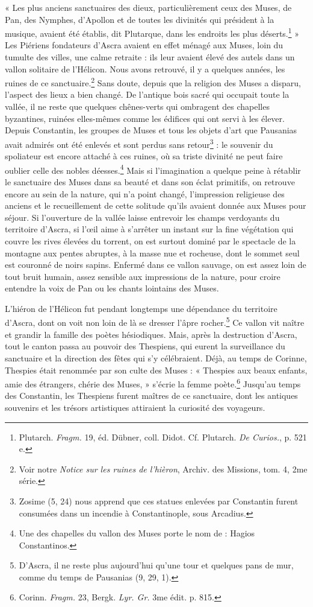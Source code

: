 \documentclass[landscape, a4paper, 11pt, oneside, polutonikogreek, french]{article}
\begin{document}
« Les plus anciens sanctuaires des dieux, particulièrement ceux des Muses, de Pan, des Nymphes, d'Apollon et de toutes les divinités qui président à la musique, avaient été établis, dit Plutarque, dans les endroits les plus déserts.\footnote{Plutarch. \emph{Fragm.} 19, éd. Dübner, coll. Didot. Cf. Plutarch. \emph{De Curios.}, p. 521 e.} » Les Piériens fondateurs d'Ascra avaient en effet ménagé aux Muses, loin du tumulte des villes, une calme retraite : ils leur avaient élevé des autels dans un vallon solitaire de l'Hélicon. Nous avons retrouvé, il y a quelques années, les ruines de ce sanctuaire.\footnote{Voir notre \emph{Notice sur les ruines de l'hièron}, Archiv. des Missions, tom. 4, 2me série.} Sans doute, depuis que la religion des Muses a disparu, l'aspect des lieux a bien changé. De l'antique bois sacré qui occupait toute la vallée, il ne reste que quelques chênes-verts qui ombragent des chapelles byzantines, ruinées elles-mêmes comme les édifices qui ont servi à les élever. Depuis Constantin, les groupes de Muses et tous les objets d'art que Pausanias avait admirés ont été enlevés et sont perdus sans retour\footnote{Zosime (5, 24) nous apprend que ces statues enlevées par Constantin furent consumées dans un incendie à Constantinople, sous Arcadius.} : le souvenir du spoliateur est encore attaché à ces ruines, où sa triste divinité ne peut faire oublier celle des nobles déesses.\footnote{Une des chapelles du vallon des Muses porte le nom de : Hagios Constantinos.} Mais si l'imagination a quelque peine à rétablir le sanctuaire des Muses dans sa beauté et dans son éclat primitifs, on retrouve encore au sein de la nature, qui n'a point changé, l'impression religieuse des anciens et le recueillement de cette solitude qu'ils avaient donnée aux Muses pour séjour. Si l'ouverture de la vallée laisse entrevoir les champs verdoyants du territoire d'Ascra, si l'œil aime à s'arrêter un instant sur la fine végétation qui couvre les rives élevées du torrent, on est surtout dominé par le spectacle de la montagne aux pentes abruptes, à la masse nue et rocheuse, dont le sommet seul est couronné de noirs sapins. Enfermé dans ce vallon sauvage, on est assez loin de tout bruit humain, assez sensible aux impressions de la nature, pour croire entendre la voix de Pan ou les chants lointains des Muses.

L'hiéron de l'Hélicon fut pendant longtemps une dépendance du territoire d'Ascra, dont on voit non loin de là se dresser l'âpre rocher.\footnote{D'Ascra, il ne reste plus aujourd'hui qu'une tour et quelques pans de mur, comme du temps de Pausanias (9, 29, 1).} Ce vallon vit naître et grandir la famille des poètes hésiodiques. Mais, après la destruction d'Ascra, tout le canton passa au pouvoir des Thespiens, qui eurent la surveillance du sanctuaire et la direction des fêtes qui s'y célébraient. Déjà, au temps de Corinne, Thespies était renommée par son culte des Muses : « Thespies aux beaux enfants, amie des étrangers, chérie des Muses, » s'écrie la femme poète.\footnote{Corinn. \emph{Fragm.} 23, Bergk. \emph{Lyr. Gr.} 3me édit. p. 815.} Jusqu'au temps des Constantin, les Thespiens furent maîtres de ce sanctuaire, dont les antiques souvenirs et les trésors artistiques attiraient la curiosité des voyageurs.
\end{document}
